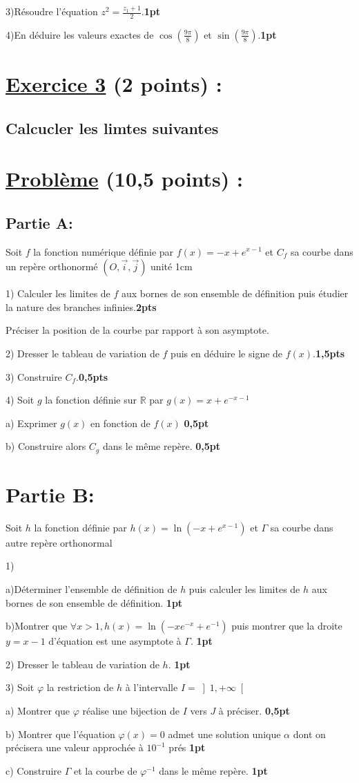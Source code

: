 \documentclass[12pt]{article}
\begin{document}
3)Résoudre l’équation $z^{2}=\frac{z_{1}+1}{2}$.\textbf{1pt}

4)En déduire les valeurs exactes de $\cos(\frac{9\pi}{8})$ et $\sin(\frac{9\pi}{8})$.\textbf{1pt}
\section*{\underline{Exercice 3} (2 points) :}
\subsection*{Calcucler les limtes suivantes}
\section*{\underline{Problème} (10,5 points) :}
\subsection*{Partie A:}
Soit $f$ la fonction numérique définie par $f(x)=-x+e^{x-1}$  et $C_{f}$ sa courbe dans un repère orthonormé $(O,\vec{i},\vec{j})$ unité 1cm

1) Calculer les limites de $f$ aux bornes de son ensemble de définition puis étudier la nature des branches infinies.\textbf{2pts}

Préciser la position de la courbe par rapport à son asymptote.

2) Dresser le tableau de variation de $f$ puis en déduire le signe de $f(x)$.\textbf{1,5pts}

3) Construire $C_{f}$.\textbf{0,5pts}

4) Soit $g$ la fonction définie sur $\mathbb{R}$ par $g(x)=x+e^{-x-1}$

  a) Exprimer $g(x)$ en fonction de $f(x)$ \textbf{0,5pt}
  
  b) Construire alors $C_{g}$ dans le même repère.  \textbf{0,5pt}
\section*{Partie B:}
Soit $h$ la fonction définie par $h(x)=\ln(-x+e^{x-1})$  et $\Gamma$ sa courbe dans autre repère orthonormal

1)

	a)Déterminer l’ensemble de définition de $h$ puis calculer les limites de $h$ aux bornes de son ensemble de définition. \textbf{1pt}
	
	b)Montrer que $\forall x>1, h(x)=\ln(-xe^{-x}+e^{-1}) $ puis montrer que la droite $y=x-1$ d’équation est une asymptote à $\Gamma$. \textbf{1pt}
	
2) Dresser le tableau de variation de  $h$.   \textbf{1pt}
    
3) Soit $\varphi$ la restriction de $h$ à l’intervalle $I=\left] 1, +\infty \right[ $
    
    a) Montrer que $\varphi$  réalise une bijection de $I$ vers $J$  à préciser.
    \textbf{0,5pt}
        
    b) Montrer que l’équation $\varphi(x)=0$ admet une solution unique $\alpha$ dont on précisera une valeur approchée à $10^{-1}$ prés   \textbf{1pt}
    
    c) Construire $\Gamma$ et la courbe de $\varphi^{-1}$  dans le même repère.  \textbf{1pt}
\end{document}
